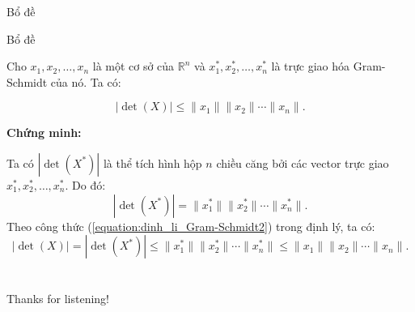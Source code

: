 \documentclass{beamer}
\numberwithin{equation}{section}
\begin{document}
\begin{frame}{Bổ đề} 

\begin{block}{Bổ đề}\label{BD1}

Cho $x_1, x_2, \ldots, x_n$ là một cơ sở của $\mathbb{R}^n$
và $x_1^*, x_2^*, \ldots, x_n^*$ là trực giao hóa Gram-Schmidt của nó.
Ta có:

\[
|\det(X)| \leq \|x_1\|\|x_2\|\cdots\|x_n\|.
\]

\end{block}

\textbf{Chứng minh:}

Ta có $|\det(X^*)|$ là thể tích hình hộp $n$ chiều căng bởi các vector trực giao $x_1^*, x_2^*, \ldots, x_n^*$. Do đó:
\[
|\det(X^*)| = \|x_1^*\|\|x_2^*\|\cdots\|x_n^*\|.
\]
Theo công thức (\ref{equation:dinh_li_Gram-Schmidt2}) trong định lý, ta có:
\[
|\det(X)| = |\det(X^*)| \leq \|x_1^*\|\|x_2^*\|\cdots\|x_n^*\| \leq \|x_1\|\|x_2\|\cdots\|x_n\|.
\]

\end{frame}

\section*{}
\begin{frame}{}
\centering
\Huge{Thanks for listening!}
\end{frame}
\end{document}
